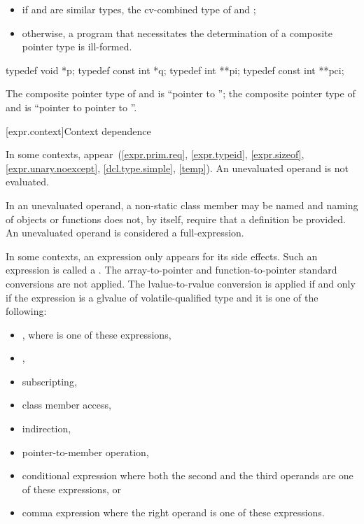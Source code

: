\begin{itemize}
\item
if  and  are similar types, the cv-combined type of  and
;

\item
otherwise, a program that necessitates the determination of a
composite pointer type is ill-formed.
\end{itemize}

\begin{example}
\begin{codeblock}
typedef void *p;
typedef const int *q;
typedef int **pi;
typedef const int **pci;
\end{codeblock}

The composite pointer type of  and  is ``pointer to ''; the
composite pointer type of  and  is ``pointer to  pointer to
''.
\end{example}

[expr.context]{Context dependence}

\pnum
In some contexts, 
appear~(\ref{expr.prim.req},
\ref{expr.typeid},
\ref{expr.sizeof},
\ref{expr.unary.noexcept},
\ref{dcl.type.simple},
\ref{temp}).
An unevaluated operand is not evaluated.
\begin{note}
In an unevaluated operand, a non-static class member may be
named and naming of objects or functions does not, by
itself, require that a definition be provided.
An unevaluated operand is considered a full-expression.
\end{note}

\pnum
In some contexts, an expression only appears for its side effects. Such an
expression is called a .
The array-to-pointer
and function-to-pointer standard conversions are not
applied. The lvalue-to-rvalue conversion is applied
if and only if
the expression is a glvalue of volatile-qualified type and it is one of the
following:

\begin{itemize}
\item \tcode{(}  \tcode{)}, where
   is one of these expressions,
\item {},
\item subscripting,
\item class member access,
\item indirection,
\item pointer-to-member operation,
\item conditional expression where both the second and the
      third operands are one of these expressions, or
\item comma expression where the right operand is one of
      these expressions.
\end{itemize}


